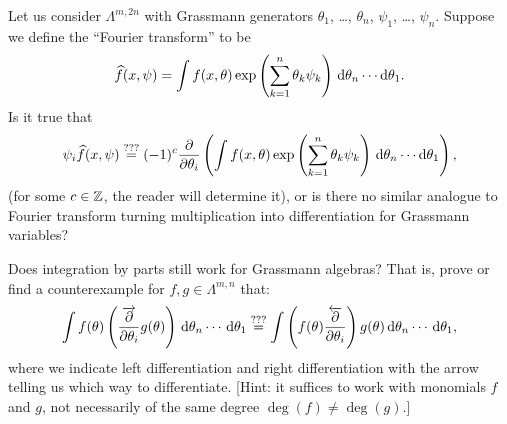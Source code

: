 \begin{exercise}
Let us consider $\Lambda^{m,2n}$ with Grassmann generators $\theta_{1}$,
\dots, $\theta_{n}$, $\psi_{1}$, \dots, $\psi_{n}$. Suppose we define
the ``Fourier transform'' to be
\begin{equation}
\widehat{f}(x,\psi) = \int f(x,\theta)\exp\left(\sum_{k=1}^{n}\theta_{k}\psi_{k}\right)\,\mathrm{d}\theta_{n}\cdots\mathrm{d}\theta_{1}.
\end{equation}
Is it true that
\begin{equation}
\psi_{i}\widehat{f}(x,\psi) \stackrel{???}{=} (-1)^{c} \frac{\partial}{\partial\theta_{i}}\left(\int f(x,\theta)\exp\left(\sum_{k=1}^{n}\theta_{k}\psi_{k}\right)\,\mathrm{d}\theta_{n}\cdots\mathrm{d}\theta_{1}\right),
\end{equation}
(for some $c\in\mathbb{Z}$, the reader will determine it),
or is there no similar analogue to Fourier transform turning
multiplication into differentiation for Grassmann variables?
\end{exercise}

\begin{exercise}
Does integration by parts still work for Grassmann algebras? That is,
prove or find a counterexample for $f,g\in\Lambda^{m,n}$ that:
\begin{equation}
\int f(\theta)\left(\frac{\overrightarrow{\partial}}{\partial\theta_{i}}g(\theta)\right)\,\mathrm{d}\theta_{n}\cdots\,\mathrm{d}\theta_{1}
\stackrel{???}{=}
\int \left(f(\theta)\frac{\overleftarrow{\partial}}{\partial\theta_{i}}\right)g(\theta)\,\mathrm{d}\theta_{n}\cdots\,\mathrm{d}\theta_{1},
\end{equation}
where we indicate left differentiation and right differentiation with
the arrow telling us which way to differentiate. [Hint: it suffices to
  work with monomials $f$ and $g$, not necessarily of the same degree $\deg(f)\neq\deg(g)$.]
\end{exercise}
